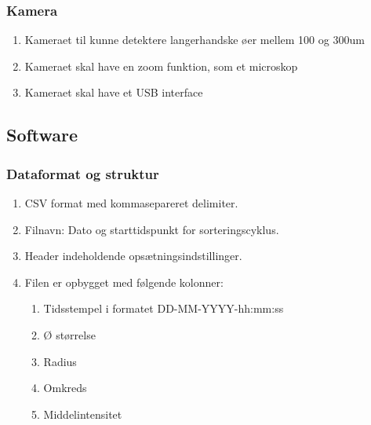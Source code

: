 \subsubsection{Kamera} \label{subsub:camera}
\begin{enumerate}
\item Kameraet til kunne detektere langerhandske øer mellem 100 og 300um
\item Kameraet skal have en zoom funktion, som et microskop
\item Kameraet skal have et USB interface
\end{enumerate}


\subsection{Software} 

\subsubsection{Dataformat og struktur} \label{subsub:software}
\begin{enumerate}
\item CSV format med kommasepareret delimiter. 
\item Filnavn: Dato og starttidspunkt for sorteringscyklus.
\item Header indeholdende opsætningsindstillinger.
\item Filen er opbygget med følgende kolonner: 
\begin{enumerate}
\item Tidsstempel i formatet DD-MM-YYYY-hh:mm:ss
\item Ø størrelse
\item Radius
\item Omkreds
\item Middelintensitet
\end{enumerate}
\end{enumerate}

